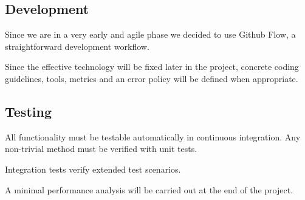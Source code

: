 \documentclass[a4paper]{article}
\begin{document}
\subsection{Development}

Since we are in a very early and agile phase we decided to use Github Flow\cite{github-flow}, a straightforward development workflow.

Since the effective technology will be fixed later in the project, concrete coding guidelines, tools, metrics and an error policy will be defined when appropriate.


\subsection{Testing}
All functionality must be testable automatically in continuous integration. Any non-trivial method must be verified with unit tests.

Integration tests verify extended test scenarios.

A minimal performance analysis will be carried out at the end of the project.



\end{document}
